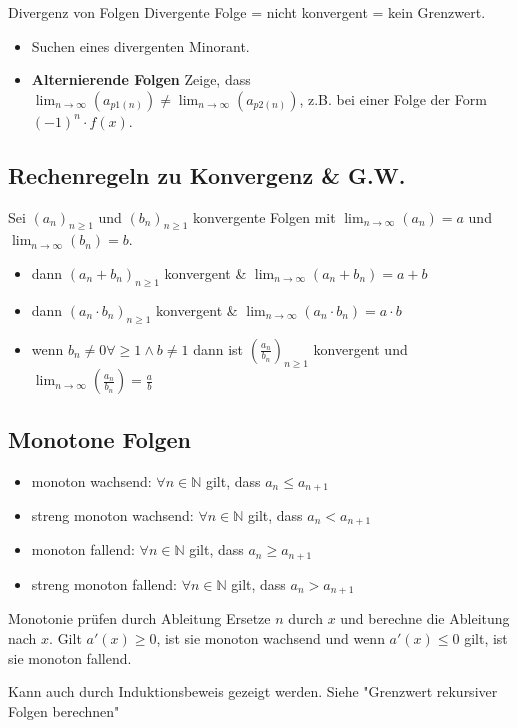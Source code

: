 \documentclass[a4paper]{article}
\def\limn{\lim_{n\to \infty}}
\begin{document}
\begin{bspbox}{Divergenz von Folgen}
  Divergente Folge = nicht konvergent = kein Grenzwert.
  \begin{itemize}[leftmargin=3mm, topsep=1pt, parsep=1pt]
    \item[1.] Suchen eines divergenten Minorant.
    \item[2.] \textbf{Alternierende Folgen} Zeige, dass \\ $\limn (a_{p1(n)}) \neq \limn (a_{p2(n)})$, z.B. bei einer Folge der Form $(-1)^n \cdot f(x)$.
  \end{itemize}
\end{bspbox}

\subsection{Rechenregeln zu Konvergenz \& G.W.}
Sei $(a_n)_{n \geqslant 1}$ und $(b_n)_{n \geqslant 1}$ konvergente Folgen mit $\limn (a_n) = a$ und $\limn (b_n) = b$.
\begin{itemize}[leftmargin=4.5mm, topsep=1pt, parsep=1pt]
  \item dann $(a_n + b_n)_{n \geqslant 1}$ konvergent \& $\limn (a_n + b_n) = a + b$  
  \item dann $(a_n \cdot b_n)_{n \geqslant 1}$ konvergent \& $\limn (a_n \cdot b_n) = a \cdot b$
  \item wenn $b_n \neq 0 \forall \geqslant 1 \land b \neq 1$ dann ist $\left(\frac{a_n}{b_n}\right)_{n \geqslant 1}$ konvergent und $\limn \left(\frac{a_n}{b_n}\right) = \frac{a}{b}$ 
\end{itemize}

\subsection{Monotone Folgen}
\begin{itemize}[leftmargin=3mm, topsep=1pt, parsep=1pt]
  \item monoton wachsend: $\forall n \in \mathbb{N}$ gilt, dass $a_n \leqslant a_{n + 1}$
  \item streng monoton wachsend: $\forall n \in \mathbb{N}$ gilt, dass  $a_n < a_{n + 1}$
  \item monoton fallend: $\forall n \in \mathbb{N}$ gilt, dass $a_n \geqslant a_{n + 1}$
  \item streng monoton fallend: $\forall n \in \mathbb{N}$ gilt, dass $a_n > a_{n + 1}$
\end{itemize}
\begin{bspbox}{Monotonie prüfen durch Ableitung}
  Ersetze $n$ durch $x$ und berechne die Ableitung nach $x$. Gilt $a'(x) \geqslant 0$, ist sie monoton wachsend und wenn $a'(x) \leqslant 0$ gilt, ist sie monoton fallend.
\end{bspbox}
Kann auch durch Induktionsbeweis gezeigt werden. Siehe "Grenzwert rekursiver Folgen berechnen"
\end{document}
